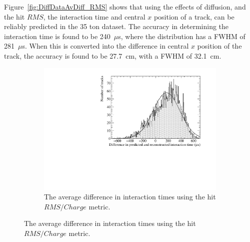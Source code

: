 Figure~\ref{fig:DiffDataAvDiff_RMS} shows that using the effects of diffusion, and the hit $RMS$, the interaction time and central $x$ position of a track, can be reliably predicted in the 35 ton dataset. The accuracy in determining the interaction time is found to be 240~$\mu$s, where the distribution has a FWHM of 281~$\mu$s. When this is converted into the difference in central $x$ position of the track, the accuracy is found to be 27.7~cm, with a FWHM of 32.1~cm. \\

\begin{figure}
  \centering
  \begin{subfigure}{0.6\textwidth}
    \centering
    \includegraphics[width=\textwidth]{Data_AvTimeDiff_RMS_Int}
    \caption{The average difference in interaction times using the hit $RMS/Charge$ metric.}
    \label{fig:DiffDataAvDiff_RMS_Int_T}
  \end{subfigure}


\end{figure}
